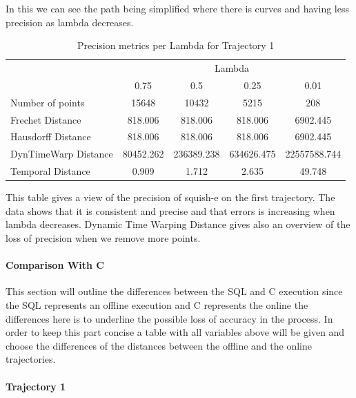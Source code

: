 In this we can see the path being simplified where there is curves and having less precision as lambda decreases.

\begin{table}[htbp]
\centering
\label{tab:precision_metrics}
\begin{tabular}{@{}lcccc@{}}
\toprule
& \multicolumn{4}{c}{Lambda} \\
\cmidrule{2-5}
& 0.75       & 0.5        & 0.25       & 0.01       \\
\midrule
Number of points           & 15648 & 10432 & 5215 & 208 \\
Frechet Distance              & 818.006 & 818.006 & 818.006 & 6902.445 \\
Hausdorff Distance             & 818.006 & 818.006 & 818.006 & 6902.445 \\
DynTimeWarp Distance            & 80452.262 &  236389.238 & 634626.475 & 22557588.744\\
Temporal Distance            & 0.909 & 1.712 & 2.635 & 49.748\\
\bottomrule
\end{tabular}
\caption{Precision metrics per Lambda for Trajectory 1 }
\end{table}

This table gives a view of the precision of squish-e on the first trajectory. The data shows that it is consistent and precise and that errors is increasing when lambda decreases. Dynamic Time Warping Distance gives also an overview of the loss of precision when we remove more points.

\paragraph{Comparison With C}
This section will outline the differences between the SQL and C execution since the SQL represents an offline execution and C represents the online the differences here is to underline the possible loss of accuracy in the process. In order to keep this part concise a table with all variables above will be given and choose the differences of the distances between the offline and the online trajectories.

\paragraph{Trajectory 1}

